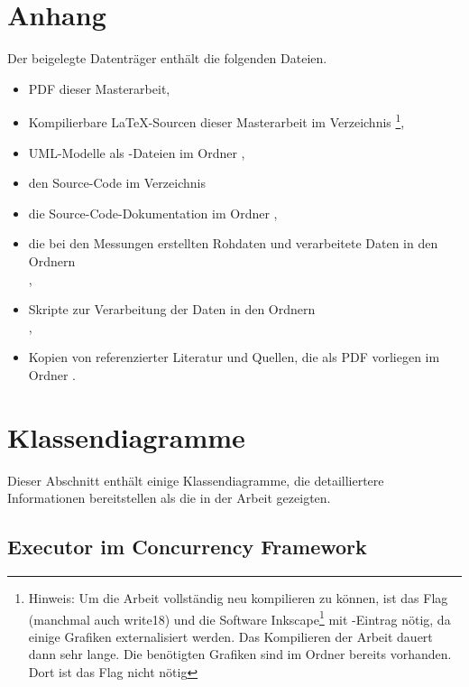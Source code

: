\appendix
\clearpage
\renewcommand{\sectionmark}[1]{\markboth{\Ifnumbered{section}{Anhang \thesection}{}}{#1}}
\setcounter{page}{1}

\section*{Anhang}
{}

Der beigelegte Datenträger enthält die folgenden Dateien.

\begin{itemize}
	\item PDF dieser Masterarbeit,
	\item Kompilierbare \LaTeX-Sourcen dieser Masterarbeit im Verzeichnis \footnote{Hinweis: Um die Arbeit vollständig neu kompilieren zu können, ist das Flag  (manchmal auch write18) und die Software Inkscape\footnote{\url{https://inkscape.org/}} mit -Eintrag nötig, da einige Grafiken externalisiert werden. Das Kompilieren der Arbeit dauert dann sehr lange. Die benötigten Grafiken sind im Ordner  bereits vorhanden. Dort ist das Flag nicht nötig},
	\item UML-Modelle als -Dateien im Ordner ,
	\item den Source-Code im Verzeichnis 
	\item die Source-Code-Dokumentation im Ordner ,
	\item die bei den Messungen erstellten Rohdaten und verarbeitete Daten in den Ordnern\\ ,
	\item Skripte zur Verarbeitung der Daten in den Ordnern\\ ,
	\item Kopien von referenzierter Literatur und Quellen, die als PDF vorliegen im Ordner .
\end{itemize}

\clearpage
\section{Klassendiagramme}
Dieser Abschnitt enthält einige Klassendiagramme, die detailliertere Informationen bereitstellen als die in der Arbeit gezeigten.
\subsection{Executor im Concurrency Framework}\label{appendix:concFrameworkExecutor}


